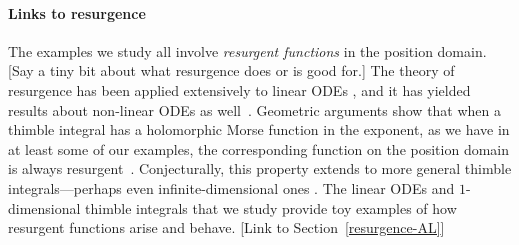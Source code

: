 \documentclass{article}
\theoremstyle{definition}
\theoremstyle{plain}
\newenvironment{todo}{\color{Coral}}{\color{black}}
\begin{document}
\paragraph{Links to resurgence}
%
The examples we study all involve {\em resurgent functions} in the position domain. \begin{todo}[Say a tiny bit about what resurgence does or is good for.]\end{todo} The theory of resurgence has been applied extensively to linear ODEs \cite{loday1994stokes,diverg-resurg--ii}, and it has yielded results about non-linear ODEs as well~\cite{costin-PI,costin_kruskal,diverg-resurg-iii,schiappa-PI}. Geometric arguments show that when a thimble integral has a holomorphic Morse function in the exponent, as we have in at least some of our examples, the corresponding function on the position domain is always resurgent~\cite{Maxim_slide_ERC}\cite[Section 6.2]{kontsevich2022analyticity}. Conjecturally, this property extends to more general thimble integrals---perhaps even infinite-dimensional ones \cite[examples~5--6]{Maxim_slide_ERC}. The linear ODEs and $1$-dimensional thimble integrals that we study provide toy examples of how resurgent functions arise and behave. \begin{todo}[Link to Section~\ref{resurgence-AL}]\end{todo}
%
\end{document}
